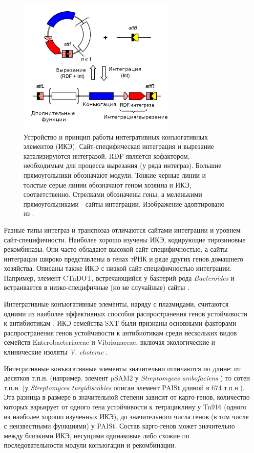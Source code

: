 \begin{figure}[!ht] 
  \center
  \includegraphics [width=0.7\textwidth] {Dissertation/images/lit/ice.jpg}
  \caption{Устройство и принцип работы интегративных конъюгативных элементов (ИКЭ). Сайт-специфическая интеграция и вырезание катализируются интегразой. RDF является кофактором, необходимым для процесса вырезания (у ряда интеграз). Большие прямоугольники обозначают модули. Тонкие черные линии и толстые серые линии обозначают геном хозяина и ИКЭ, соответственно. Стрелками обозначены гены, а меленькими прямоугольниками - сайты интеграции. Изображение адоптировано из \cite{bellanger2014conjugative}.} 
  \label{img:ice}  
\end{figure}

Разные типы интеграз и транспозаз отличаются сайтами интеграции и уровнем сайт-специфичности. Наиболее хорошо изучены ИКЭ, кодирующие тирозиновые рекомбиназы. Они часто обладают высокой сайт специфичностью, а сайты интеграции широко представлены в генах тРНК и ряде других генов домашнего хозяйства. Описаны также ИКЭ с низкой сайт-специфичностью интеграции. Например, элемент CTnDOT, встречающийся у бактерий рода \textit{Bacteroides} и встраивается в низко-специфичные (но не случайные) сайты \cite{cheng2000integration}. 

Интегративные конъюгативные элементы, наряду с плазмидами, считаются одними из наиболее эффективных способов распространения генов устойчивости к антибиотикам \cite{botelho2020role}. ИКЭ семейства SXT были признаны основными факторами распространения генов устойчивости к антибиотикам среди нескольких видов семейств Enterobacteriaceae и Vibrionaceae, включая экологические и клинические изоляты \textit{V. cholerae} \cite{carraro2015biology}. 

Интегративные конъюгативные элементы значительно отличаются по длине: от десятков т.п.н. (например, элемент pSAM2 у \textit{Streptomyces ambofaciens} \cite{pernodet1984plasmids}) то сотен т.п.н. (у \textit{Streptomyces turgidiscabies} описан элемент PAISt длиной в 674 т.п.н.\cite{kers2005large}). Эта разница в размере в значительной степени зависит от карго-генов, количество которых варьирует от одного гена устойчивости к тетрациклину у Tn916 (одного из наиболее хорошо изученных ИКЭ), до значительного числа генов (в том числе с неизвестными функциями) у PAISt. Состав карго-генов может значительно между близкими ИКЭ, несущими одинаковые либо схожие по последовательности модули конъюгации и рекомбинации. 

